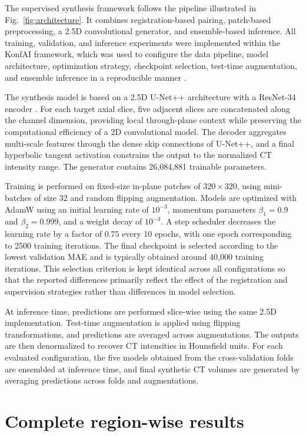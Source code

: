 \documentclass[lettersize,journal]{IEEEtran}
\begin{document}
The supervised synthesis framework follows the pipeline illustrated in Fig.~\ref{fig:architecture}. It combines registration-based pairing, patch-based preprocessing, a 2.5D convolutional generator, and ensemble-based inference. All training, validation, and inference experiments were implemented within the KonfAI framework, which was used to configure the data pipeline, model architecture, optimization strategy, checkpoint selection, test-time augmentation, and ensemble inference in a reproducible manner \cite{boussot2025konfai}.

The synthesis model is based on a 2.5D U-Net++ architecture with a ResNet-34 encoder \cite{zhou2018unet++}. For each target axial slice, five adjacent slices are concatenated along the channel dimension, providing local through-plane context while preserving the computational efficiency of a 2D convolutional model. The decoder aggregates multi-scale features through the dense skip connections of U-Net++, and a final hyperbolic tangent activation constrains the output to the normalized CT intensity range. The generator contains 26,084,881 trainable parameters.

Training is performed on fixed-size in-plane patches of $320 \times 320$, using mini-batches of size 32 and random flipping augmentation. Models are optimized with AdamW using an initial learning rate of $10^{-3}$, momentum parameters $\beta_1 = 0.9$ and $\beta_2 = 0.999$, and a weight decay of $10^{-3}$. A step scheduler decreases the learning rate by a factor of $0.75$ every 10 epochs, with one epoch corresponding to 2500 training iterations. The final checkpoint is selected according to the lowest validation MAE and is typically obtained around 40,000 training iterations. This selection criterion is kept identical across all configurations so that the reported differences primarily reflect the effect of the registration and supervision strategies rather than differences in model selection.

At inference time, predictions are performed slice-wise using the same 2.5D implementation. Test-time augmentation is applied using flipping transformations, and predictions are averaged across augmentations. The outputs are then denormalized to recover CT intensities in Hounsfield units. For each evaluated configuration, the five models obtained from the cross-validation folds are ensembled at inference time, and final synthetic CT volumes are generated by averaging predictions across folds and augmentations.

\section{Complete region-wise results}
\label{app:regional_results}
\end{document}

